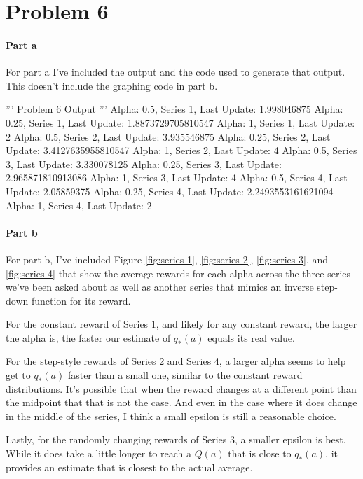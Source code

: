 \documentclass[12pt]{article}
\begin{document}
\section{Problem 6}

\paragraph{Part a} For part a I've included the output and the code used to generate that output. This doesn't include the graphing code in part b.


\begin{python}
  '''
  Problem 6 Output
  '''
  Alpha: 0.5, Series 1, Last Update: 1.998046875
  Alpha: 0.25, Series 1, Last Update: 1.8873729705810547
  Alpha: 1, Series 1, Last Update: 2
  Alpha: 0.5, Series 2, Last Update: 3.935546875
  Alpha: 0.25, Series 2, Last Update: 3.4127635955810547
  Alpha: 1, Series 2, Last Update: 4
  Alpha: 0.5, Series 3, Last Update: 3.330078125
  Alpha: 0.25, Series 3, Last Update: 2.965871810913086
  Alpha: 1, Series 3, Last Update: 4
  Alpha: 0.5, Series 4, Last Update: 2.05859375
  Alpha: 0.25, Series 4, Last Update: 2.2493553161621094
  Alpha: 1, Series 4, Last Update: 2
\end{python}

\paragraph{Part b} For part b, I've included Figure \ref{fig:series-1}, \ref{fig:series-2}, \ref{fig:series-3}, and \ref{fig:series-4} that show the average rewards for each alpha across the three series we've been asked about as well as another series that mimics an inverse step-down function for its reward.

For the constant reward of Series 1, and likely for any constant reward, the larger the alpha is, the faster our estimate of $q_*(a)$ equals its real value.

For the step-style rewards of Series 2 and Series 4, a larger alpha seems to help get to $q_*(a)$ faster than a small one, similar to the constant reward distributions. It's possible that when the reward changes at a different point than the midpoint that that is not the case. And even in the case where it does change in the middle of the series, I think a small epsilon is still a reasonable choice.

Lastly, for the randomly changing rewards of Series 3, a smaller epsilon is best. While it does take a little longer to reach a $Q(a)$ that is close to $q_*(a)$, it provides an estimate that is closest to the actual average.
\end{document}
